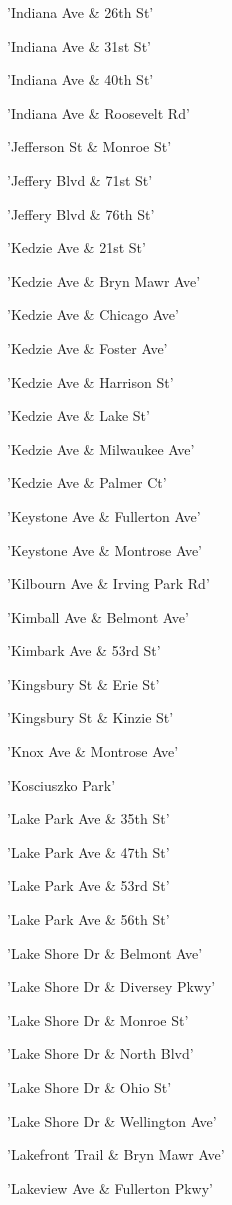 \documentclass[11pt]{article}
\begin{document}
\begin{enumerate*}
\item 'Indiana Ave \& 26th St'
\item 'Indiana Ave \& 31st St'
\item 'Indiana Ave \& 40th St'
\item 'Indiana Ave \& Roosevelt Rd'
\item 'Jefferson St \& Monroe St'
\item 'Jeffery Blvd \& 71st St'
\item 'Jeffery Blvd \& 76th St'
\item 'Kedzie Ave \& 21st St'
\item 'Kedzie Ave \& Bryn Mawr Ave'
\item 'Kedzie Ave \& Chicago Ave'
\item 'Kedzie Ave \& Foster Ave'
\item 'Kedzie Ave \& Harrison St'
\item 'Kedzie Ave \& Lake St'
\item 'Kedzie Ave \& Milwaukee Ave'
\item 'Kedzie Ave \& Palmer Ct'
\item 'Keystone Ave \& Fullerton Ave'
\item 'Keystone Ave \& Montrose Ave'
\item 'Kilbourn Ave \& Irving Park Rd'
\item 'Kimball Ave \& Belmont Ave'
\item 'Kimbark Ave \& 53rd St'
\item 'Kingsbury St \& Erie St'
\item 'Kingsbury St \& Kinzie St'
\item 'Knox Ave \& Montrose Ave'
\item 'Kosciuszko Park'
\item 'Lake Park Ave \& 35th St'
\item 'Lake Park Ave \& 47th St'
\item 'Lake Park Ave \& 53rd St'
\item 'Lake Park Ave \& 56th St'
\item 'Lake Shore Dr \& Belmont Ave'
\item 'Lake Shore Dr \& Diversey Pkwy'
\item 'Lake Shore Dr \& Monroe St'
\item 'Lake Shore Dr \& North Blvd'
\item 'Lake Shore Dr \& Ohio St'
\item 'Lake Shore Dr \& Wellington Ave'
\item 'Lakefront Trail \& Bryn Mawr Ave'
\item 'Lakeview Ave \& Fullerton Pkwy'

\end{enumerate*}
\end{document}
